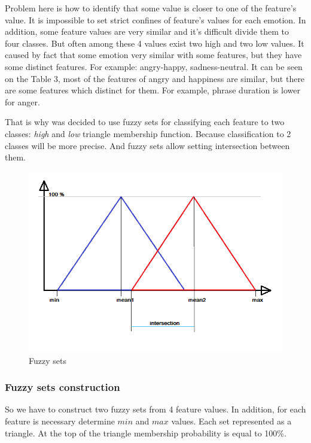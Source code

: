 \documentclass[14pt]{extarticle}
\begin{document}
Problem here is how to identify that some value is closer to one of the feature's value. It is impossible to set strict confines of feature's
values for each emotion. In addition, some feature values are very similar and it's difficult divide them to four classes. But often among these 4 values exist two high and two low values. It caused by fact that some emotion very similar with some features, but they have some distinct features.
For example: angry-happy, sadness-neutral. It can be seen on the Table 3, most of the features of angry and happiness are similar, but there are some features which distinct for them. For example, phrase duration is lower for anger.

That is why was decided to use fuzzy sets for classifying each feature to two classes: \emph{high} and \emph{low} triangle membership function.  Because classification to 2 classes will be more precise. And fuzzy sets allow setting intersection between them.
\begin{figure}[t]
	\centering
		\includegraphics[scale=0.7]{images/fuzzy-sets.png}
	\caption{Fuzzy sets}
	\label{fig:fuzzy-sets}
\end{figure}

\subsubsection{Fuzzy sets construction}
So we have to construct two fuzzy sets from 4 feature values. In addition, for each feature is necessary determine $min$ and $max$ values. Each set represented as a triangle. At the top of the triangle membership probability is equal to 100\%. 
\end{document}
